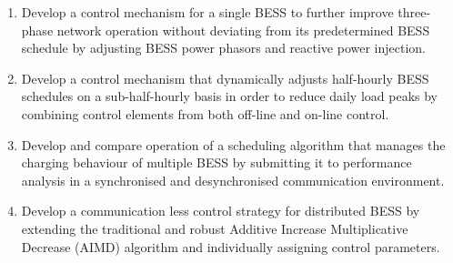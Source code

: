 \begin{enumerate}[
labelindent=*,
style=multiline,
leftmargin=*,
label=\textbf{Objective~\arabic*}
]
	\item \label{objective-1} Develop a control mechanism for a single BESS to further improve three-phase network operation without deviating from its predetermined BESS schedule by adjusting BESS power phasors and reactive power injection.
	\item \label{objective-2} Develop a control mechanism that dynamically adjusts half-hourly BESS schedules on a sub-half-hourly basis in order to reduce daily load peaks by combining control elements from both off-line and on-line control.
	\item \label{objective-3} Develop and compare operation of a scheduling algorithm that manages the charging behaviour of multiple BESS by submitting it to performance analysis in a synchronised and desynchronised communication environment.
	\item \label{objective-4} Develop a communication less control strategy for distributed BESS by extending the traditional and robust Additive Increase Multiplicative Decrease (AIMD) algorithm and individually assigning control parameters.
\end{enumerate}

